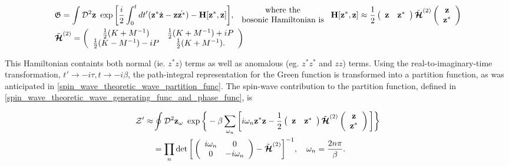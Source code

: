 \documentclass{homework}
\begin{document}
\begin{equation}
\begin{split}
    &\mathfrak{G} = \int \mathcal{D}^2 {\bf z} \textnormal{ } \exp \bigg[\frac{i}{2} \int_{0}^{t} dt'({\bf z}^{*}\dot{{\bf z}} - {\bf z}\dot{{\bf z}^{*}}) - {\bf H}[{\bf z}^{*}, {\bf z}] \bigg], \begin{array}{cc}
         \textnormal{ where the }  \\
         \textnormal{ bosonic Hamiltonian is } 
    \end{array} {\bf H}[{\bf z}^{*}, {\bf z}] \approx \frac{1}{2} \left(\begin{array}{cc}
          {\bf z} & {\bf z}^{*}
    \end{array}\right) \tilde{\bm{\mathcal{H}}}^{(2)} \left( \begin{array}{c}
          {\bf z} \\
          {\bf z}^{*}
    \end{array}\right) \\
    & \tilde{\bm{\mathcal{H}}}^{(2)} = \left(\begin{array}{cc}
         \frac{1}{2} (K+M^{-1}) & \frac{1}{2} (K+M^{-1}) + iP  \\
         \frac{1}{2} (K-M^{-1}) -iP & \frac{1}{2} (K+M^{-1}).
    \end{array}\right)
\end{split}
\end{equation}

This Hamiltonian containts both normal (ie. $z^* z$) terms as well as anomalous (eg. $z^* z^*$ and $zz$) terms. Using the real-to-imaginary-time transformation, $t' \rightarrow -i\tau, t \rightarrow -i\beta$, the path-integral representation for the Green function is transformed into a partition function, as was anticipated in \cref{spin_wave_theoretic_wave_partition_func}. The spin-wave contribution to the partition function, defined in \cref{spin_wave_theoretic_wave_generating_func_and_phase_func}, is 

\begin{equation}
\begin{split}
    \mathcal{Z}' \approx& \oint \mathcal{D}^2 {\bf z}_\omega \textnormal{ } \exp \bigg\{-\beta \sum_{\omega_n} \bigg[i \omega_n {\bf z}^* {\bf z} - \frac{1}{2} \left(\begin{array}{cc}
          {\bf z} & {\bf z}^{*}
    \end{array}\right) \tilde{\bm{\mathcal{H}}}^{(2)} \left( \begin{array}{c}
          {\bf z} \\
          {\bf z}^{*}
    \end{array}\right) \bigg]\bigg\} \\
    &= \prod_n \det \bigg[\left(\begin{array}{cc}
        i \omega_n & 0  \\
        0 & -i\omega_n
    \end{array}\right) - \tilde{\bm{\mathcal{H}}}^{(2)} \bigg]^{-1}, \quad \omega_n = \frac{2n\pi}{\beta}. 
\end{split}
\end{equation}
\end{document}
